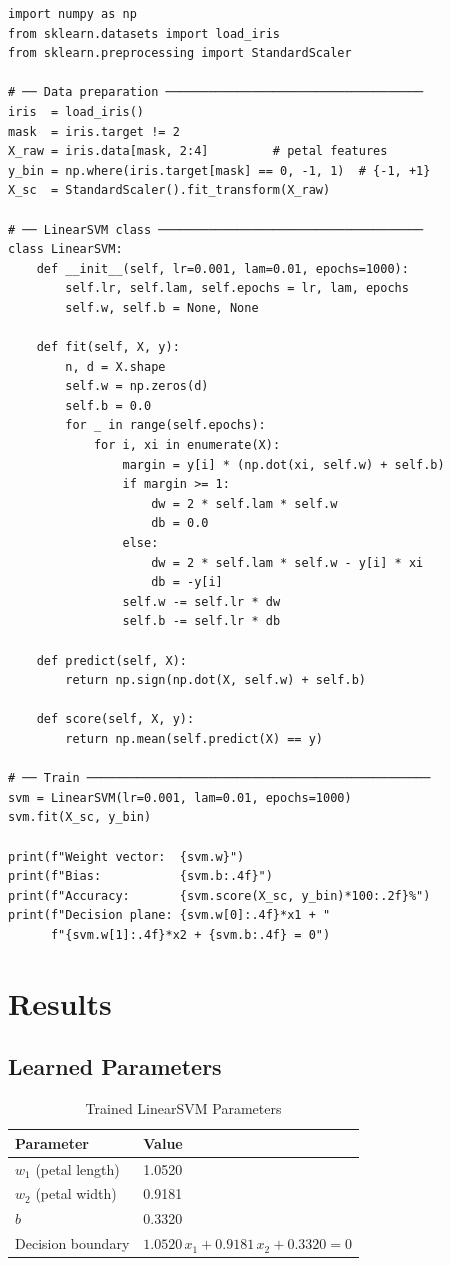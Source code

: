 \documentclass[12pt,a4paper]{article}
\begin{document}
\begin{lstlisting}[caption={LinearSVM — primal sub-gradient descent}]
import numpy as np
from sklearn.datasets import load_iris
from sklearn.preprocessing import StandardScaler

# ── Data preparation ────────────────────────────────────
iris  = load_iris()
mask  = iris.target != 2
X_raw = iris.data[mask, 2:4]         # petal features
y_bin = np.where(iris.target[mask] == 0, -1, 1)  # {-1, +1}
X_sc  = StandardScaler().fit_transform(X_raw)

# ── LinearSVM class ─────────────────────────────────────
class LinearSVM:
    def __init__(self, lr=0.001, lam=0.01, epochs=1000):
        self.lr, self.lam, self.epochs = lr, lam, epochs
        self.w, self.b = None, None

    def fit(self, X, y):
        n, d = X.shape
        self.w = np.zeros(d)
        self.b = 0.0
        for _ in range(self.epochs):
            for i, xi in enumerate(X):
                margin = y[i] * (np.dot(xi, self.w) + self.b)
                if margin >= 1:
                    dw = 2 * self.lam * self.w
                    db = 0.0
                else:
                    dw = 2 * self.lam * self.w - y[i] * xi
                    db = -y[i]
                self.w -= self.lr * dw
                self.b -= self.lr * db

    def predict(self, X):
        return np.sign(np.dot(X, self.w) + self.b)

    def score(self, X, y):
        return np.mean(self.predict(X) == y)

# ── Train ────────────────────────────────────────────────
svm = LinearSVM(lr=0.001, lam=0.01, epochs=1000)
svm.fit(X_sc, y_bin)

print(f"Weight vector:  {svm.w}")
print(f"Bias:           {svm.b:.4f}")
print(f"Accuracy:       {svm.score(X_sc, y_bin)*100:.2f}%")
print(f"Decision plane: {svm.w[0]:.4f}*x1 + "
      f"{svm.w[1]:.4f}*x2 + {svm.b:.4f} = 0")
\end{lstlisting}

\section{Results}

\subsection{Learned Parameters}

\begin{table}[H]
\centering
\caption{Trained LinearSVM Parameters}
\begin{tabular}{ll}
\toprule
\textbf{Parameter} & \textbf{Value} \\ \midrule
$w_1$ (petal length) & 1.0520 \\
$w_2$ (petal width)  & 0.9181 \\
$b$                  & 0.3320 \\
Decision boundary    & $1.0520\,x_1 + 0.9181\,x_2 + 0.3320 = 0$ \\
\bottomrule
\end{tabular}
\end{table}
\end{document}
